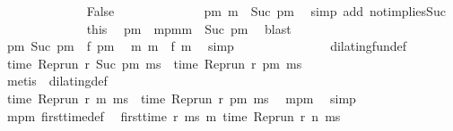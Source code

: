 \begin{isabellebody}
\isanewline
\ \ \ \ \ \ \ \ \ \ \ \ \isamarkupfalse%
\ False\isanewline
\ \ \ \ \ \ \ \ \ \ \ \ \isamarkupfalse%
\ {\isacartoucheopen}{\isasymexists}pm{\isachardot}\ m\ {\isacharequal}\ Suc\ pm{\isacartoucheclose}\ \isamarkupfalse%
\ {\isacharparenleft}simp\ add{\isacharcolon}\ not{}{\isacharunderscore}implies{\isacharunderscore}Suc{\isacharparenright}\isanewline
\ \ \ \ \ \ \ \ \ \ \ \ \isamarkupfalse%
\ this\ \isamarkupfalse%
\ pm\ \ mpm{\isacharcolon}{\isacartoucheopen}m\ {\isacharequal}\ Suc\ pm{\isacartoucheclose}\ \isamarkupfalse%
\ blast\isanewline
\ \ \ \ \ \ \ \ \ \ \ \ \isamarkupfalse%
\ {\isacartoucheopen}{\isasymnexists}pm\ Suc\ pm\ {\isacharequal}\ f\ pm\ \isamarkupfalse%
\ {\isacartoucheopen}{\isasymnexists}m\ m\ {\isacharequal}\ f\ m\ \isamarkupfalse%
\ simp\ \isanewline
\ \ \ \ \ \ \ \ \ \ \ \ \isamarkupfalse%
\ dilating{\isacharunderscore}fun{\isacharunderscore}def\ \isamarkupfalse%
\ {\isacartoucheopen}time\ {\isacharparenleft}Rep{\isacharunderscore}run\ r\ {\isacharparenleft}Suc\ pm{\isacharparenright}\ ms{\isacharparenright}\ {\isacharequal}\ time\ {\isacharparenleft}Rep{\isacharunderscore}run\ r\ pm\ ms{\isacharparenright}{\isacartoucheclose}\isanewline
\ \ \ \ \ \ \ \ \ \ \ \ \ \ \isamarkupfalse%
\ {\isacharparenleft}metis\ {\isacharasterisk}\ dilating{\isacharunderscore}def{\isacharparenright}\isanewline
\ \ \ \ \ \ \ \ \ \ \ \ \isamarkupfalse%
\ {\isacartoucheopen}time\ {\isacharparenleft}Rep{\isacharunderscore}run\ r\ m\ ms{\isacharparenright}\ {\isacharequal}\ time\ {\isacharparenleft}Rep{\isacharunderscore}run\ r\ pm\ ms{\isacharparenright}{\isacartoucheclose}\ \isamarkupfalse%
\ mpm\ \isamarkupfalse%
\ simp\isanewline
\ \ \ \ \ \ \ \ \ \ \ \ \isamarkupfalse%
\ mpm\ first{\isacharunderscore}time{\isacharunderscore}def\ \isamarkupfalse%
\ {\isacartoucheopen}{\isasymnot}{\isacharparenleft}first{\isacharunderscore}time\ r\ ms\ m\ {\isacharparenleft}time\ {\isacharparenleft}Rep{\isacharunderscore}run\ r\ n\ ms{\isacharparenright}\ {\isacharplus}\ {\isasymdelta}{\isasymtau}{\isacharparenright}{\isacharparenright}{\isacartoucheclose}\isanewline
\ \ \ \ \ \ \ \ \ \ \ \ \ \ \isamarkupfalse%

\end{isabellebody}

